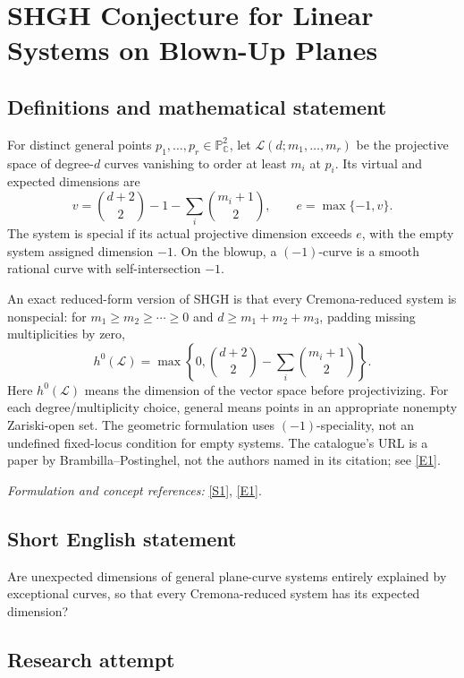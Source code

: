 \documentclass[11pt]{article}
\begin{document}
\section*{\texorpdfstring{SHGH Conjecture for Linear Systems on Blown-Up Planes}{SHGH Conjecture for Linear Systems on Blown-Up Planes}}\label{30001233}
\subsection{Definitions and mathematical statement}
For distinct general points $p_1,\ldots,p_r\in{\mathbb{P}}^2_{{\mathbb{C}}}$, let $\mathcal L(d;m_1,\ldots,m_r)$ be the projective space of degree-$d$ curves vanishing to order at least $m_i$ at $p_i$. Its virtual and expected dimensions are
\[
 v=\binom{d+2}{2}-1-\sum_i\binom{m_i+1}{2},
 \qquad e=\max\{-1,v\}.
\]
The system is special if its actual projective dimension exceeds $e$, with the empty system assigned dimension $-1$. On the blowup, a $(-1)$-curve is a smooth rational curve with self-intersection $-1$.

An exact reduced-form version of SHGH is that every Cremona-reduced system is nonspecial: for $m_1\ge m_2\ge\cdots\ge0$ and $d\ge m_1+m_2+m_3$, padding missing multiplicities by zero,
\[
 h^0(\mathcal L)=\max\left\{0,\binom{d+2}{2}
                                  -\sum_i\binom{m_i+1}{2}\right\}.
\]
Here $h^0(\mathcal L)$ means the dimension of the vector space before projectivizing. For each degree/multiplicity choice, general means points in an appropriate nonempty Zariski-open set. The geometric formulation uses $(-1)$-speciality, not an undefined fixed-locus condition for empty systems. The catalogue's URL is a paper by Brambilla--Postinghel, not the authors named in its citation; see \href{https://link.springer.com/article/10.1007/s40574-025-00468-5}{[E1]}.
\par\smallskip\textit{Formulation and concept references:} \href{https://link.springer.com/article/10.1007/s40574-025-00468-5}{[S1]}, \href{https://link.springer.com/article/10.1007/s40574-025-00468-5}{[E1]}.

\subsection{Short English statement}
Are unexpected dimensions of general plane-curve systems entirely explained by exceptional curves, so that every Cremona-reduced system has its expected dimension?
\subsection{Research attempt}
\end{document}
